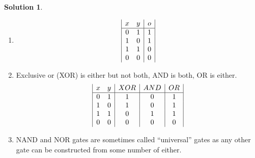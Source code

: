 \documentclass[10pt]{article}
\theoremstyle{definition}
\newtheorem{soln}{Solution}
\begin{document}
\begin{soln} ~
  \begin{enumerate}[label=(\alph*)]
    \item\begin{displaymath}
      \begin{array}{|c c|c|}
        x & y & o \\
        \hline
        0 & 1 & 1 \\
        1 & 0 & 1 \\
        1 & 1 & 0 \\
        0 & 0 & 0
      \end{array}
    \end{displaymath}
    \item Exclusive or (XOR) is either but not both, AND is both, OR is either.
          \begin{displaymath}
            \begin{array}{|c c|c|c|c|}
              x & y & XOR & AND & OR \\
              \hline
              0 & 1 & 1   & 0   & 1  \\
              1 & 0 & 1   & 0   & 1  \\
              1 & 1 & 0   & 1   & 1  \\
              0 & 0 & 0   & 0   & 0
            \end{array}
          \end{displaymath}
    \item NAND and NOR gates are sometimes called ``universal'' gates as any other gate can be constructed from some number of either.
  \end{enumerate}
\end{soln}
\newpage
\end{document}
